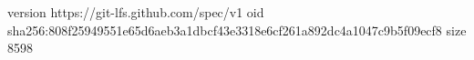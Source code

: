version https://git-lfs.github.com/spec/v1
oid sha256:808f25949551e65d6aeb3a1dbcf43e3318e6cf261a892dc4a1047c9b5f09ecf8
size 8598
